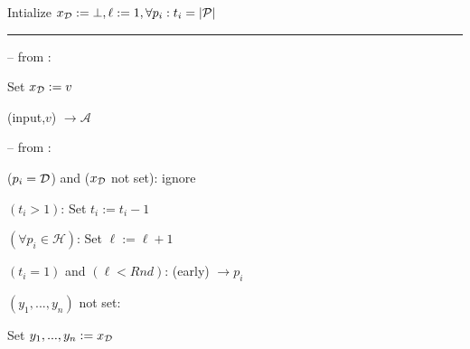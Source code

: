 %
%
%
%
%
%
%
%
%
%
%
%
%
%
%
%

%
%
%
%
%
%
%
%

\begin{bbox}[title={$\Fbc (\mathcal{D}, \mathcal{P} = p_1,...,p_n)$}]

Intialize $x_{\mathcal{D}} := \bot, \ell := 1, \forall p_i : t_i = |\mathcal{P}|$

\vspace{2mm} \hrule \vspace{2mm}

-- \OnInput {} from \Partyi:
	
	\qquad Set $x_{\mathcal{D}} := v$

	\qquad \Leak (input,$v$) $\rightarrow \mathcal{A}$

-- \OnInput {} from \Partyi:
	
	\qquad \If ($p_i = \mathcal{D}$) and ($x_{\mathcal{D}}$ not set): ignore 

	\qquad \Else \If $(t_i > 1)$: Set $t_i := t_i - 1$

		\qquad \quad \If $(\forall p_i \in \mathcal{H})$: Set $\ell := \ell + 1$

	\qquad \Else \If $(t_i = 1)$ and $(\ell < Rnd)$: \Send (early) $\rightarrow p_i$

	\qquad \Else \If $(y_1,...,y_n)$ not set:

		\qquad \quad Set $y_1,...,y_n := x_{\mathcal{D}}$

\end{bbox}

